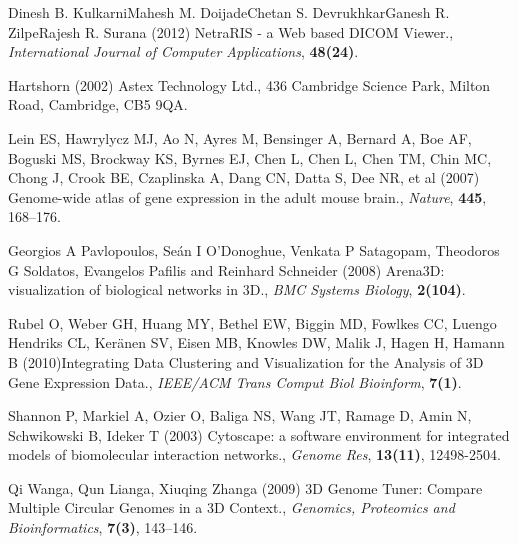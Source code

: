 \documentclass{bioinfo}
\begin{document}
\begin{thebibliography}{}


 Dinesh B. KulkarniMahesh M. DoijadeChetan S. DevrukhkarGanesh R. ZilpeRajesh R. Surana (2012) NetraRIS - a Web based DICOM Viewer., {\it International Journal of Computer Applications}, {\bf 48(24)}.

 Hartshorn (2002) Astex Technology Ltd., 436 Cambridge Science Park, Milton Road, Cambridge, CB5 9QA.

 Lein ES, Hawrylycz MJ, Ao N, Ayres M, Bensinger A, Bernard A, Boe AF, Boguski MS, Brockway KS, Byrnes EJ, Chen L, Chen L, Chen TM, Chin MC, Chong J, Crook BE, Czaplinska A, Dang CN, Datta S, Dee NR, et al (2007) Genome-wide atlas of gene expression in the adult mouse brain., {\it Nature}, {\bf 445}, 168–176.

 Georgios A Pavlopoulos, Seán I O'Donoghue, Venkata P Satagopam, Theodoros G Soldatos, Evangelos Pafilis and Reinhard Schneider (2008) Arena3D: visualization of biological networks in 3D., {\it BMC Systems Biology}, {\bf 2(104)}.

 Rubel O, Weber GH, Huang MY, Bethel EW, Biggin MD, Fowlkes CC, Luengo Hendriks CL, Keränen SV, Eisen MB, Knowles DW, Malik J, Hagen H, Hamann B (2010)Integrating Data Clustering and Visualization for the Analysis of 3D Gene Expression Data., {\it IEEE/ACM Trans Comput Biol Bioinform}, {\bf 7(1)}.

 Shannon P, Markiel A, Ozier O, Baliga NS, Wang JT, Ramage D, Amin N, Schwikowski B, Ideker T (2003) Cytoscape: a software environment for integrated models of biomolecular interaction networks., {\it Genome Res}, {\bf 13(11)}, 12498-2504.

 Qi Wanga, Qun Lianga, Xiuqing Zhanga (2009) 3D Genome Tuner: Compare Multiple Circular Genomes in a 3D Context., {\it Genomics, Proteomics and Bioinformatics}, {\bf 7(3)}, 143–146.



\end{thebibliography}
\end{document}
